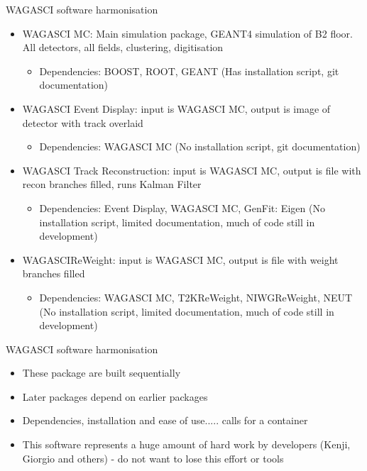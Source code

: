 \documentclass{beamer}
\begin{document}
\begin{frame}{WAGASCI software harmonisation}
    \begin{itemize}
        \item WAGASCI MC: Main simulation package, GEANT4 simulation of B2 floor. All detectors, all fields, clustering, digitisation
        \begin{itemize}
            \item Dependencies: BOOST, ROOT, GEANT (Has installation script, git documentation)
        \end{itemize}
        \item WAGASCI Event Display: input is WAGASCI MC, output is image of detector with track overlaid
        \begin{itemize}
            \item Dependencies: WAGASCI MC (No installation script, git documentation)
        \end{itemize}
        \item WAGASCI Track Reconstruction: input is WAGASCI MC, output is file with recon branches filled, runs Kalman Filter
        \begin{itemize}
            \item Dependencies: Event Display, WAGASCI MC, GenFit: Eigen (No installation script, limited documentation, much of code still in development)
        \end{itemize}
        \item WAGASCIReWeight: input is WAGASCI MC, output is file with weight branches filled
        \begin{itemize}
            \item Dependencies: WAGASCI MC, T2KReWeight, NIWGReWeight, NEUT (No installation script, limited documentation, much of code still in development)
        \end{itemize}
    \end{itemize}

\end{frame}

\begin{frame}{WAGASCI software harmonisation}
    \begin{itemize}
        \item These package are built sequentially
        \item Later packages depend on earlier packages
        \item Dependencies, installation and ease of use..... calls for a container
        \item This software represents a huge amount of hard work by developers (Kenji, Giorgio and others) - do not want to lose this effort or tools
    \end{itemize}
\end{frame}
\end{document}
